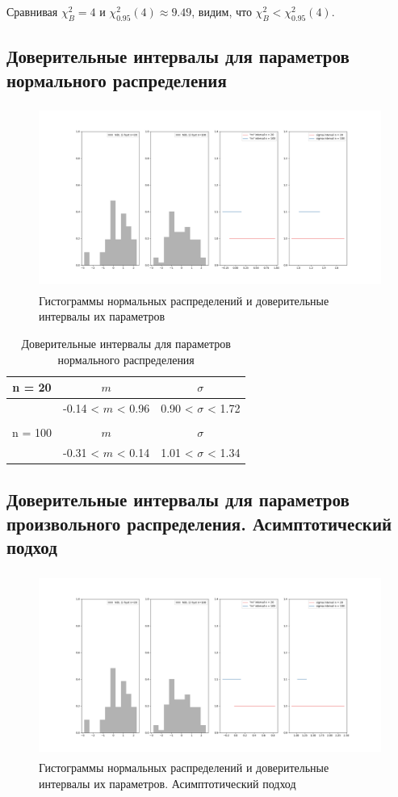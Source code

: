 \noindent Сравнивая $\chi^{2}_{B} = 4$ и $\chi^{2}_{0.95}(4) \approx 9.49$, видим, что $\chi^{2}_{B} < \chi^{2}_{0.95}(4)$.

\subsection{Доверительные интервалы для параметров нормального распределения}
\begin{figure}[H]
	\centering
	\includegraphics[width = 18cm, height = 6cm]{resources/8_1.png}
	\caption{Гистограммы нормальных распределений и доверительные интервалы их параметров}
	\label{w_pert}
\end{figure}

\begin{table}[H]
	\centering
	\begin{tabular}{| c | c | c |}
		\hline
		n = 20   &  $m$  & $\sigma$\\ \hline
		&  -0.14 < $m$ < 0.96 & 0.90 < $\sigma$ < 1.72 \\ \hline
		&   &   \\ \hline
		n = 100   &  $m$  & $\sigma$\\ \hline
		& -0.31 < $m$ < 0.14 & 1.01 < $\sigma$ < 1.34 \\
		\hline
	\end{tabular}
	\caption{Доверительные интервалы для параметров нормального распределения}
	\label{tab:interv_simple}
\end{table}

\subsection{Доверительные интервалы для параметров произвольного распределения. Асимптотический подход}
\begin{figure}[H]
	\centering
	\includegraphics[width = 18cm, height = 6cm]{resources/8_2.png}
	\caption{Гистограммы нормальных распределений и доверительные интервалы их параметров. Асимптотический подход}
	\label{w_pert}
\end{figure}

